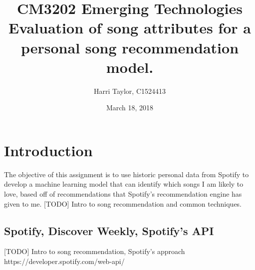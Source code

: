 \documentclass{article}
\title{
	CM3202 Emerging Technologies\\
	\large Evaluation of song attributes for a personal song recommendation model.
	}
\author{Harri Taylor, C1524413}
\date{March 18, 2018}
\begin{document}
	\maketitle
	\newpage
	
	\section{Introduction}
	The objective of this assignment is to use historic personal data from Spotify to develop a machine learning model that can identify which songs I am likely to love, based off of recommendations that Spotify's recommendation engine has given to me. [TODO] Intro to song recommendation and common techniques.
	
		\subsection{Spotify, Discover Weekly, Spotify's API}
		[TODO] Intro to song recommendation, Spotify's approach https://developer.spotify.com/web-api/
		
\end{document}
